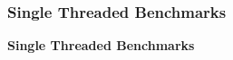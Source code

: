 \documentclass[
	aspectratio=169,
	compress,
]{beamer}
\newcommand{\navframetitle}[1]{\frametitle{#1\hfill{\footnotesize\lastsection{}}}}
\begin{document}
%
%

\begin{frame}[fragile]
	\navframetitle{Single Threaded Benchmarks}
	
	\textbf{Single Threaded Benchmarks}
\end{frame}
\end{document}

